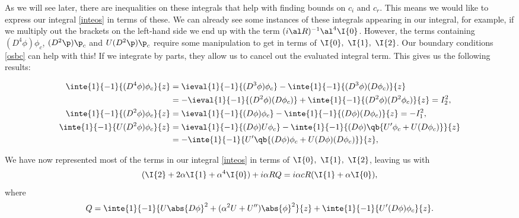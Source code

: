 As we will see later, there are inequalities on these integrals that help with finding bounds on $ c_i $ and $ c_r$. This means we would like to express our integral \eqref{inteos} in terms of these. We can already see some instances of these integrals appearing in our integral, for example, if we multiply out the brackets on the left-hand side we end up with the term $ (i \al R)^{-1} \al^4 \I{0} $. However, the terms containing $ (D^4 \phi) \phi_c $, $ (D^2 \p) \p_c $ and $ U (D^2 \p) \p_c $ require some manipulation to get in terms of $ \I{0},\ \I{1},\ \I{2}$. Our boundary conditions \eqref{osbc} can help with this! If we integrate by parts, they allow us to cancel out the evaluated integral term. This gives us the following results:


\begin{subequations}
    \begin{align}
        \inte{1}{-1}{(D^4 \phi) \phi_c}{z} &= \ieval{1}{-1}{(D^3 \phi) \phi_c} -\inte{1}{-1}{(D^3 \phi) (D \phi_c)}{z} \nonumber\\
        &= -\ieval{1}{-1}{(D^2 \phi)(D \phi_c)} + \inte{1}{-1}{(D^2 \phi)(D^2 \phi_c)}{z} = I^2_2, \\
        \inte{1}{-1}{(D^2 \phi) \phi_c}{z} &= \ieval{1}{-1}{(D \phi) \phi_c} - \inte{1}{-1}{(D \phi)(D \phi_c)}{z} = -I^2_1, \\
        \inte{1}{-1}{U (D^2 \phi) \phi_c}{z} &= \ieval{1}{-1}{(D \phi) U \phi_c} - \inte{1}{-1}{(D \phi)\qb{U' \phi_c + U (D \phi_c)}}{z} \nonumber\\ &= -\inte{1}{-1}{U' \qb{(D \phi)\phi_c + U (D \phi)(D \phi_c)}}{z},
    \end{align}
\end{subequations}

We have now represented most of the terms in our integral \eqref{inteos} in terms of $ \I{0},\ \I{1},\ \I{2}$, leaving us with
\begin{equation}
    (\I{2} + 2 \alpha \I{1} + \alpha^4 \I{0}) + i \alpha R Q = i \alpha c R (\I{1} + \alpha \I{0}),
\label{simpintos}
\end{equation}
where 
\begin{equation}
    Q = \inte{1}{-1}{U \abs{D \phi}^2 + (\alpha^2 U + U'') \abs{\phi}^2}{z} + \inte{1}{-1}{U' (D \phi) \phi_c}{z}.
\end{equation} 

